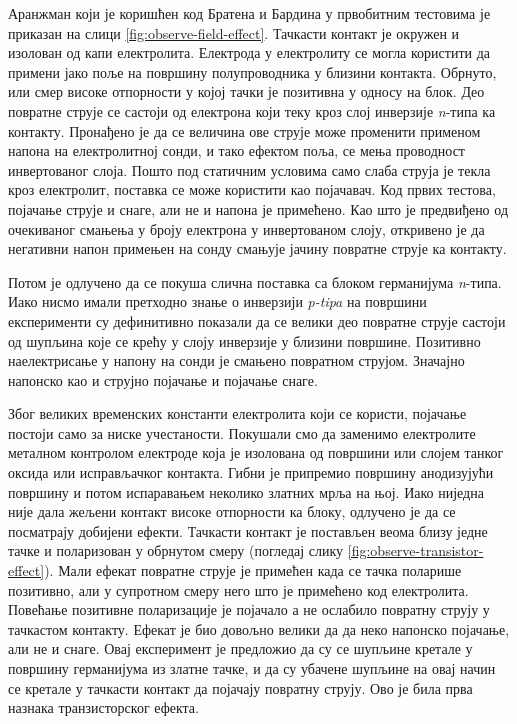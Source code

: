 \documentclass{article}
\begin{document}
Аранжман који је коришћен код Братена и Бардина у првобитним тестовима је приказан на слици \ref{fig:observe-field-effect}. Тачкасти контакт је окружен и изолован од капи електролита. Електрода у електролиту се могла користити да примени јако поље на површину полупроводника у близини контакта. Обрнуто, или смер високе отпорности у којој тачки је позитивна у односу на блок. Део повратне струје се састоји од електрона који теку кроз слој инверзије \textit{n}-типа ка контакту. Пронађено је да се величина ове струје може променити применом напона на електролитној сонди, и тако ефектом поља, се мења проводност инвертованог слоја. Пошто под статичним условима само слаба струја је текла кроз електролит, поставка се може користити као појачавач. Код првих тестова, појачање струје и снаге, али не и напона је примећено. Као што је предвиђено од очекиваног смањења у броју електрона у инвертованом слоју, откривено је да негативни напон примењен на сонду смањује јачину повратне струје ка контакту.

Потом је одлучено да се покуша слична поставка са блоком германијума \textit{n}-типа. Иако нисмо имали претходно знање о инверзији \textit{p-tipa} на површини експерименти су дефинитивно показали да се велики део повратне струје састоји од шупљина које се крећу у слоју инверзије у близини површине. Позитивно наелектрисање у напону на сонди је смањено повратном струјом. Значајно напонско као и струјно појачање и појачање снаге.

Због великих временских константи електролита који се користи, појачање постоји само за ниске учестаности. Покушали смо да заменимо електролите металном контролом електроде која је изолована од површини или слојем танког оксида или исправљачког контакта. Гибни је припремио површину анодизујући површину и потом испаравањем неколико златних мрља на њој. Иако ниједна није дала жељени контакт високе отпорности ка блоку, одлучено је да се посматрају добијени ефекти. Тачкасти контакт је постављен веома близу једне тачке и поларизован у обрнутом смеру (погледај слику \ref{fig:observe-transistor-effect}). Мали ефекат повратне струје је примећен када се тачка поларише позитивно, али у супротном смеру него што је примећено код електролита. Повећање позитивне поларизације је појачало а не ослабило повратну струју у тачкастом контакту. Ефекат је био довољно велики да да неко напонско појачање, али не и снаге. Овај експеримент је предложио да су се шупљине кретале у површину германијума из златне тачке, и да су убачене шупљине на овај начин се кретале у тачкасти контакт да појачају повратну струју. Ово је била прва назнака транзисторског ефекта.   
\end{document}
